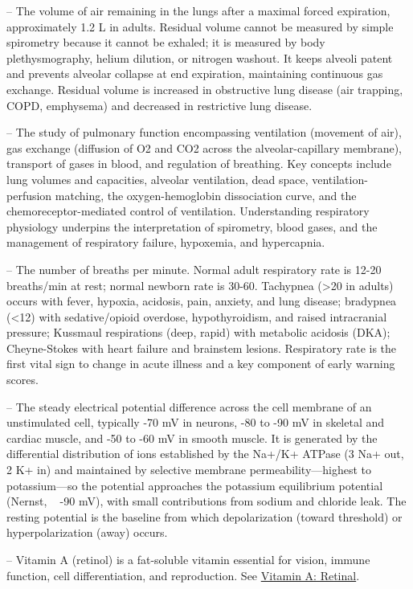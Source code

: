-- The volume of air remaining in the lungs after a maximal forced expiration, approximately 1.2 L in adults. Residual volume cannot be measured by simple spirometry because it cannot be exhaled; it is measured by body plethysmography, helium dilution, or nitrogen washout. It keeps alveoli patent and prevents alveolar collapse at end expiration, maintaining continuous gas exchange. Residual volume is increased in obstructive lung disease (air trapping, COPD, emphysema) and decreased in restrictive lung disease.

-- The study of pulmonary function encompassing ventilation (movement of air), gas exchange (diffusion of O2 and CO2 across the alveolar-capillary membrane), transport of gases in blood, and regulation of breathing. Key concepts include lung volumes and capacities, alveolar ventilation, dead space, ventilation-perfusion matching, the oxygen-hemoglobin dissociation curve, and the chemoreceptor-mediated control of ventilation. Understanding respiratory physiology underpins the interpretation of spirometry, blood gases, and the management of respiratory failure, hypoxemia, and hypercapnia.

-- The number of breaths per minute. Normal adult respiratory rate is 12-20 breaths/min at rest; normal newborn rate is 30-60. Tachypnea (>20 in adults) occurs with fever, hypoxia, acidosis, pain, anxiety, and lung disease; bradypnea (<12) with sedative/opioid overdose, hypothyroidism, and raised intracranial pressure; Kussmaul respirations (deep, rapid) with metabolic acidosis (DKA); Cheyne-Stokes with heart failure and brainstem lesions. Respiratory rate is the first vital sign to change in acute illness and a key component of early warning scores.

-- The steady electrical potential difference across the cell membrane of an unstimulated cell, typically -70 mV in neurons, -80 to -90 mV in skeletal and cardiac muscle, and -50 to -60 mV in smooth muscle. It is generated by the differential distribution of ions established by the Na+/K+ ATPase (3 Na+ out, 2 K+ in) and maintained by selective membrane permeability—highest to potassium—so the potential approaches the potassium equilibrium potential (Nernst, ~ -90 mV), with small contributions from sodium and chloride leak. The resting potential is the baseline from which depolarization (toward threshold) or hyperpolarization (away) occurs.

-- Vitamin A (retinol) is a fat-soluble vitamin essential for vision, immune function, cell differentiation, and reproduction. See \hyperlink{Vitamin A: Retinal}{Vitamin A: Retinal}.

